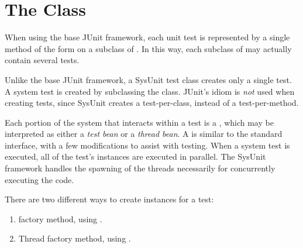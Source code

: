 \chapter{The  Class}

When using the base JUnit framework, each unit test
is represented by a single method of the form 
 on a subclass of .
In this way, each subclass of  may actually
contain several tests.

Unlike the base JUnit framework, a SysUnit test class creates
only a single test.  A system test is created by subclassing
the  class.  JUnit's 
idiom is \emph{not} used when creating tests, since SysUnit
creates a test-per-class, instead of a test-per-method.

Each portion of the system that interacts within a test
is a , which may be interpreted as either
a \emph{test bean} or a \emph{thread bean}.  A
 is similar to the standard 
interface, with a few modifications to assist with testing.
When a system test is executed, all of the test's 
instances are executed in parallel.  The SysUnit framework
handles the spawning of the threads necessarily for 
concurrently executing the code.

There are two different ways to create  instances
for a test:  

\begin{enumerate}
	\item {} factory method, using
.
	\item Thread factory method, using
.
\end{enumerate}


